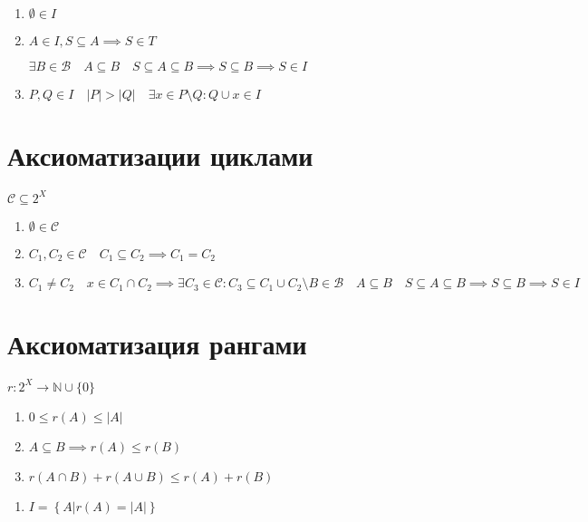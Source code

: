 \documentclass{book}
\newcommand\N{\ensuremath{\mathbb{N}}}
\renewcommand\O{\ensuremath{\emptyset}}
\theoremstyle{definition}
\begin{document}
\begin{enumerate}
    \item $\O \in I$
    \item $A\in I, S\subseteq A \implies S\in T$

        $\exists B\in \mathcal B\quad A\subseteq B\quad S\subseteq A\subseteq B \implies S\subseteq B \implies S\in I$
    \item $P, Q\in I\quad |P| > |Q|\quad \exists x\in P\setminus Q: Q\cup x\in I$ 
\end{enumerate}

\section{Аксиоматизации циклами}

$\mathcal C\subseteq 2^X$

\begin{enumerate}
    \item $\O \in \mathcal C$
    \item $C_1, C_2\in\mathcal C\quad C_1\subseteq C_2 \implies C_1 = C_2$ 
\item $C_1\neq C_2\quad x\in C_1 \cap C_2 \implies \exists C_3\in \mathcal C:C_3\subseteq C_1\cup C_2\setminus  B\in \mathcal B\quad A\subseteq B\quad S\subseteq A\subseteq B \implies S\subseteq B \implies S\in I$
\end{enumerate}

\section{Аксиоматизация рангами}

$r: 2^X \to \N \cup \{0\}$
\begin{enumerate}
    \item $0\leqslant r(A) \leqslant |A|$
    \item $A\subseteq B \implies r(A) \leqslant r(B)$
    \item $r\left( A\cap B \right)  + r\left( A\cup B \right) \leqslant r(A) + r(B)$
\end{enumerate}

\begin{enumerate}
    \item $I = \left\{ A| r(A) = |A| \right\} $
\end{enumerate}
\end{document}
